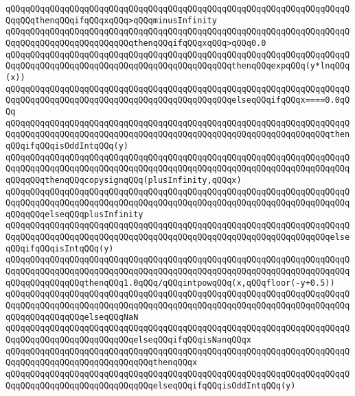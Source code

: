\verb|qQQqqQQqqQQqqQQqqQQqqQQqqQQqqQQqqQQqqQQqqQQqqQQqqQQqqQQqqQQqqQQqqQQqqQQqqQQqthenqQQqifqQQqxqQQq>qQQqminusInfinity|\newline
\verb|qQQqqQQqqQQqqQQqqQQqqQQqqQQqqQQqqQQqqQQqqQQqqQQqqQQqqQQqqQQqqQQqqQQqqQQqqQQqqQQqqQQqqQQqqQQqqQQqthenqQQqifqQQqxqQQq>qQQq0.0|\newline
\verb|qQQqqQQqqQQqqQQqqQQqqQQqqQQqqQQqqQQqqQQqqQQqqQQqqQQqqQQqqQQqqQQqqQQqqQQqqQQqqQQqqQQqqQQqqQQqqQQqqQQqqQQqqQQqqQQqqQQqthenqQQqexpqQQq(y*lnqQQq(x))|\newline
\verb|qQQqqQQqqQQqqQQqqQQqqQQqqQQqqQQqqQQqqQQqqQQqqQQqqQQqqQQqqQQqqQQqqQQqqQQqqQQqqQQqqQQqqQQqqQQqqQQqqQQqqQQqqQQqqQQqqQQqelseqQQqifqQQqx====0.0qQQq|\newline
\verb|qQQqqQQqqQQqqQQqqQQqqQQqqQQqqQQqqQQqqQQqqQQqqQQqqQQqqQQqqQQqqQQqqQQqqQQqqQQqqQQqqQQqqQQqqQQqqQQqqQQqqQQqqQQqqQQqqQQqqQQqqQQqqQQqqQQqqQQqthenqQQqifqQQqisOddIntqQQq(y)|\newline
\verb|qQQqqQQqqQQqqQQqqQQqqQQqqQQqqQQqqQQqqQQqqQQqqQQqqQQqqQQqqQQqqQQqqQQqqQQqqQQqqQQqqQQqqQQqqQQqqQQqqQQqqQQqqQQqqQQqqQQqqQQqqQQqqQQqqQQqqQQqqQQqqQQqqQQqthenqQQqcopysignqQQq(plusInfinity,qQQqx)|\newline
\verb|qQQqqQQqqQQqqQQqqQQqqQQqqQQqqQQqqQQqqQQqqQQqqQQqqQQqqQQqqQQqqQQqqQQqqQQqqQQqqQQqqQQqqQQqqQQqqQQqqQQqqQQqqQQqqQQqqQQqqQQqqQQqqQQqqQQqqQQqqQQqqQQqqQQqelseqQQqplusInfinity|\newline
\verb|qQQqqQQqqQQqqQQqqQQqqQQqqQQqqQQqqQQqqQQqqQQqqQQqqQQqqQQqqQQqqQQqqQQqqQQqqQQqqQQqqQQqqQQqqQQqqQQqqQQqqQQqqQQqqQQqqQQqqQQqqQQqqQQqqQQqqQQqelseqQQqifqQQqisIntqQQq(y)|\newline
\verb|qQQqqQQqqQQqqQQqqQQqqQQqqQQqqQQqqQQqqQQqqQQqqQQqqQQqqQQqqQQqqQQqqQQqqQQqqQQqqQQqqQQqqQQqqQQqqQQqqQQqqQQqqQQqqQQqqQQqqQQqqQQqqQQqqQQqqQQqqQQqqQQqqQQqqQQqqQQqthenqQQq1.0qQQq/qQQqintpowqQQq(x,qQQqfloor(-y+0.5))|\newline
\verb|qQQqqQQqqQQqqQQqqQQqqQQqqQQqqQQqqQQqqQQqqQQqqQQqqQQqqQQqqQQqqQQqqQQqqQQqqQQqqQQqqQQqqQQqqQQqqQQqqQQqqQQqqQQqqQQqqQQqqQQqqQQqqQQqqQQqqQQqqQQqqQQqqQQqqQQqqQQqelseqQQqNaN|\newline
\verb|qQQqqQQqqQQqqQQqqQQqqQQqqQQqqQQqqQQqqQQqqQQqqQQqqQQqqQQqqQQqqQQqqQQqqQQqqQQqqQQqqQQqqQQqqQQqqQQqelseqQQqifqQQqisNanqQQqx|\newline
\verb|qQQqqQQqqQQqqQQqqQQqqQQqqQQqqQQqqQQqqQQqqQQqqQQqqQQqqQQqqQQqqQQqqQQqqQQqqQQqqQQqqQQqqQQqqQQqqQQqqQQqthenqQQqx|\newline
\verb|qQQqqQQqqQQqqQQqqQQqqQQqqQQqqQQqqQQqqQQqqQQqqQQqqQQqqQQqqQQqqQQqqQQqqQQqqQQqqQQqqQQqqQQqqQQqqQQqqQQqelseqQQqifqQQqisOddIntqQQq(y)|\newline
